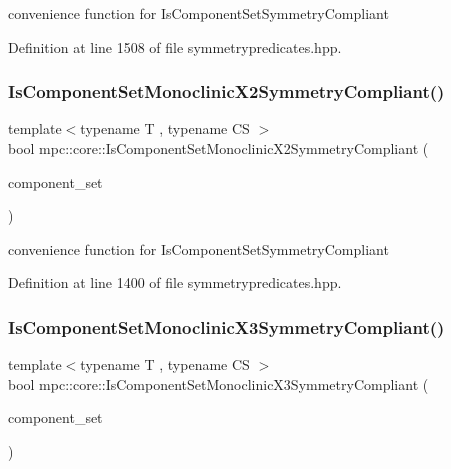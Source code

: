convenience function for Is\+Component\+Set\+Symmetry\+Compliant 



Definition at line 1508 of file symmetrypredicates.\+hpp.

\mbox{\label{namespacempc_1_1core_ac121083b9dbf6e9a9e29c41aed0fd68a}} 
\subsubsection{\texorpdfstring{Is\+Component\+Set\+Monoclinic\+X2\+Symmetry\+Compliant()}{IsComponentSetMonoclinicX2SymmetryCompliant()}}
{\footnotesize\ttfamily template$<$typename T , typename CS $>$ \\
bool mpc\+::core\+::\+Is\+Component\+Set\+Monoclinic\+X2\+Symmetry\+Compliant (\begin{DoxyParamCaption}\item[{const std\+::set$<$ \mbox{\hyperlink{namespacempc_1_1core_ac3a232afc7c680d580628e834030482f}{mpc\+::core\+::\+Tensor\+Rank4\+Component}}$<$ T $>$ $>$ \&}]{component\+\_\+set }\end{DoxyParamCaption})}



convenience function for Is\+Component\+Set\+Symmetry\+Compliant 



Definition at line 1400 of file symmetrypredicates.\+hpp.

\mbox{\label{namespacempc_1_1core_a03b3facbec930564c01185edc6834398}} 
\subsubsection{\texorpdfstring{Is\+Component\+Set\+Monoclinic\+X3\+Symmetry\+Compliant()}{IsComponentSetMonoclinicX3SymmetryCompliant()}}
{\footnotesize\ttfamily template$<$typename T , typename CS $>$ \\
bool mpc\+::core\+::\+Is\+Component\+Set\+Monoclinic\+X3\+Symmetry\+Compliant (\begin{DoxyParamCaption}\item[{const std\+::set$<$ \mbox{\hyperlink{namespacempc_1_1core_ac3a232afc7c680d580628e834030482f}{mpc\+::core\+::\+Tensor\+Rank4\+Component}}$<$ T $>$ $>$ \&}]{component\+\_\+set }\end{DoxyParamCaption})}



